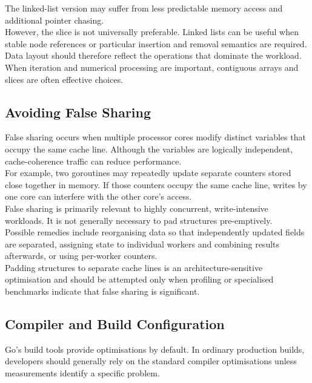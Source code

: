 The linked-list version may suffer from less predictable memory access and additional pointer chasing.\\

However, the slice is not universally preferable. Linked lists can be useful when stable node references or particular insertion and removal semantics are required.\\

Data layout should therefore reflect the operations that dominate the workload. When iteration and numerical processing are important, contiguous arrays and slices are often effective choices.

\subsection{Avoiding False Sharing}

False sharing occurs when multiple processor cores modify distinct variables that occupy the same cache line. Although the variables are logically independent, cache-coherence traffic can reduce performance.\\

For example, two goroutines may repeatedly update separate counters stored close together in memory. If those counters occupy the same cache line, writes by one core can interfere with the other core's access.\\

False sharing is primarily relevant to highly concurrent, write-intensive workloads. It is not generally necessary to pad structures pre-emptively.\\

Possible remedies include reorganising data so that independently updated fields are separated, assigning state to individual workers and combining results afterwards, or using per-worker counters.\\

Padding structures to separate cache lines is an architecture-sensitive optimisation and should be attempted only when profiling or specialised benchmarks indicate that false sharing is significant.

\subsection{Compiler and Build Configuration}

Go's build tools provide optimisations by default. In ordinary production builds, developers should generally rely on the standard compiler optimisations unless measurements identify a specific problem.\\

